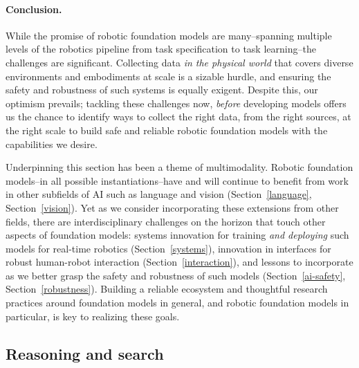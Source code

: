 \paragraph{Conclusion.} While the promise of robotic foundation models are many--spanning multiple levels of the robotics pipeline from task specification to task learning--the challenges are significant. Collecting data \textit{in the physical world} that covers diverse environments and embodiments at scale is a sizable hurdle, and ensuring the safety and robustness of such systems is equally exigent. Despite this, our optimism prevails; tackling these challenges now, \textit{before} developing models offers us the chance to identify ways to collect the right data, from the right sources, at the right scale to build safe and reliable robotic foundation models with the capabilities we desire. 

Underpinning this section has been a theme of multimodality. Robotic foundation models--in all possible instantiations--have and will continue to benefit from work in other subfields of AI such as language and vision (Section~\ref{language}, Section~\ref{vision}). Yet as we consider incorporating these extensions from other fields, there are interdisciplinary challenges on the horizon that touch other aspects of foundation models: systems innovation for training \textit{and deploying} such models for real-time robotics (Section~\ref{systems}), innovation in interfaces for robust human-robot interaction (Section~\ref{interaction}), and lessons to incorporate as we better grasp the safety and robustness of such models (Section~\ref{ai-safety}, Section~\ref{robustness}). Building a reliable ecosystem and thoughtful research practices around foundation models in general, and robotic foundation models in particular, is key to realizing these goals.

\newsection
\subsection{Reasoning and search}
\label{sec:reasoning}

